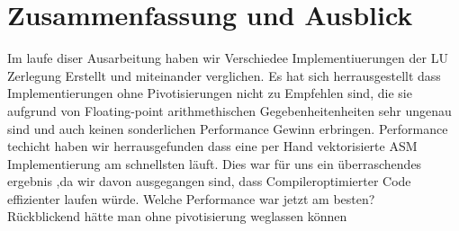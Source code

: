 \documentclass[course=erap]{aspdoc}
\begin{document}
\section{Zusammenfassung und Ausblick}
Im laufe diser Ausarbeitung haben wir Verschiedee Implementiuerungen der LU Zerlegung Erstellt und miteinander verglichen. Es hat sich herrausgestellt dass Implementierungen ohne Pivotisierungen nicht zu Empfehlen sind,
die sie aufgrund von Floating-point arithmethischen Gegebenheitenheiten sehr ungenau sind und auch keinen sonderlichen Performance Gewinn erbringen. Performance techicht haben wir herrausgefunden dass eine per Hand vektorisierte ASM Implementierung am 
schnellsten läuft. Dies war für uns ein überraschendes ergebnis ,da wir davon ausgegangen sind, dass Compileroptimierter Code effizienter laufen würde.   
Welche Performance war jetzt am besten?\\
Rückblickend hätte man ohne pivotisierung weglassen können\\

{}
\end{document}
